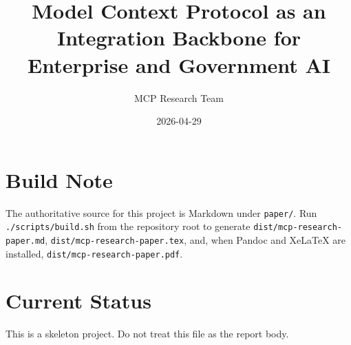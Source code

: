 \documentclass{article}
\title{Model Context Protocol as an Integration Backbone for Enterprise and Government AI}
\author{MCP Research Team}
\date{2026-04-29}
\begin{document}
\maketitle

\section*{Build Note}

The authoritative source for this project is Markdown under \texttt{paper/}.
Run \texttt{./scripts/build.sh} from the repository root to generate
\texttt{dist/mcp-research-paper.md}, \texttt{dist/mcp-research-paper.tex}, and,
when Pandoc and XeLaTeX are installed, \texttt{dist/mcp-research-paper.pdf}.

\section*{Current Status}

This is a skeleton project. Do not treat this file as the report body.
\end{document}
